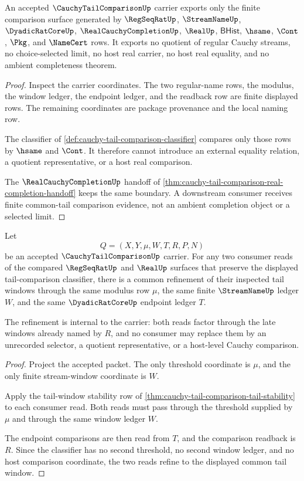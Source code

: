 \begin{theorem}
\label{thm:cauchy-tail-comparison-non-escape-boundary}
An accepted $\CauchyTailComparisonUp$ carrier exports only the finite comparison surface generated by $\RegSeqRatUp$, $\StreamNameUp$, $\DyadicRatCoreUp$, $\RealCauchyCompletionUp$, $\RealUp$, $\mathsf{BHist}$, $\hsame$, $\Cont$, $\Pkg$, and $\NameCert$ rows. It exports no quotient of regular Cauchy streams, no choice-selected limit, no host real carrier, no host real equality, and no ambient completeness theorem.
\end{theorem}
\begin{proof}
Inspect the carrier coordinates. The two regular-name rows, the modulus, the window ledger, the endpoint ledger, and the readback row are finite displayed rows. The remaining coordinates are package provenance and the local naming row.

The classifier of \autoref{def:cauchy-tail-comparison-classifier} compares only those rows by $\hsame$ and $\Cont$. It therefore cannot introduce an external equality relation, a quotient representative, or a host real comparison.

The $\RealCauchyCompletionUp$ handoff of \autoref{thm:cauchy-tail-comparison-real-completion-handoff} keeps the same boundary. A downstream consumer receives finite common-tail comparison evidence, not an ambient completion object or a selected limit.
\end{proof}

\begin{theorem}
\label{thm:cauchy-tail-comparison-common-tail-window}
Let
$$
Q=(X,Y,\mu,W,T,R,P,N)
$$
be an accepted $\CauchyTailComparisonUp$ carrier. For any two consumer reads of the compared $\RegSeqRatUp$ and $\RealUp$ surfaces that preserve the displayed tail-comparison classifier, there is a common refinement of their inspected tail windows through the same modulus row $\mu$, the same finite $\StreamNameUp$ ledger $W$, and the same $\DyadicRatCoreUp$ endpoint ledger $T$.

The refinement is internal to the carrier: both reads factor through the late windows already named by $R$, and no consumer may replace them by an unrecorded selector, a quotient representative, or a host-level Cauchy comparison.
\end{theorem}
\begin{proof}
Project the accepted packet. The only threshold coordinate is $\mu$, and the only finite stream-window coordinate is $W$.

Apply the tail-window stability row of \autoref{thm:cauchy-tail-comparison-tail-stability} to each consumer read. Both reads must pass through the threshold supplied by $\mu$ and through the same window ledger $W$.

The endpoint comparisons are then read from $T$, and the comparison readback is $R$. Since the classifier has no second threshold, no second window ledger, and no host comparison coordinate, the two reads refine to the displayed common tail window.
\end{proof}

